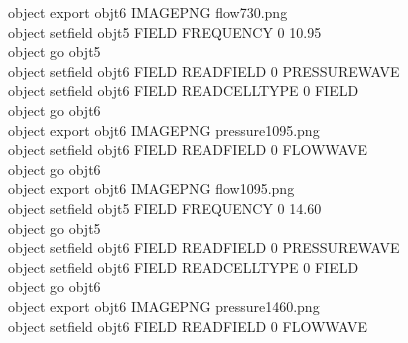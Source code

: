 \begin{appendices}
	\newpage
	\begin{algorithm}[H]
		\SetAlgoLined
		object export obj\underline{\space\space}t6 IMAGE\underline{\space\space}PNG flow\underline{\space\space}7\underline{\space\space}30.png \\
		object set\underline{\space\space}field obj\underline{\space\space}t5 FIELD FREQUENCY 0 10.95 \\
		object go obj\underline{\space\space}t5 \\
		object set\underline{\space\space}field obj\underline{\space\space}t6 FIELD READ\underline{\space\space}FIELD 0 PRESSURE\underline{\space\space}WAVE \\
		object set\underline{\space\space}field obj\underline{\space\space}t6 FIELD READ\underline{\space\space}CELL\underline{\space\space}TYPE 0 FIELD \\
		object go obj\underline{\space\space}t6 \\
		object export obj\underline{\space\space}t6 IMAGE\underline{\space\space}PNG pressure\underline{\space\space}10\underline{\space\space}95.png \\
		object set\underline{\space\space}field obj\underline{\space\space}t6 FIELD READ\underline{\space\space}FIELD 0 FLOW\underline{\space\space}WAVE \\
		object go obj\underline{\space\space}t6 \\
		object export obj\underline{\space\space}t6 IMAGE\underline{\space\space}PNG flow\underline{\space\space}10\underline{\space\space}95.png \\
		object set\underline{\space\space}field obj\underline{\space\space}t5 FIELD FREQUENCY 0 14.60 \\
		object go obj\underline{\space\space}t5 \\
		object set\underline{\space\space}field obj\underline{\space\space}t6 FIELD READ\underline{\space\space}FIELD 0 PRESSURE\underline{\space\space}WAVE \\
		object set\underline{\space\space}field obj\underline{\space\space}t6 FIELD READ\underline{\space\space}CELL\underline{\space\space}TYPE 0 FIELD \\
		object go obj\underline{\space\space}t6 \\
		object export obj\underline{\space\space}t6 IMAGE\underline{\space\space}PNG pressure\underline{\space\space}14\underline{\space\space}60.png \\
		object set\underline{\space\space}field obj\underline{\space\space}t6 FIELD READ\underline{\space\space}FIELD 0 FLOW\underline{\space\space}WAVE \\

\end{algorithm}
\end{appendices}
